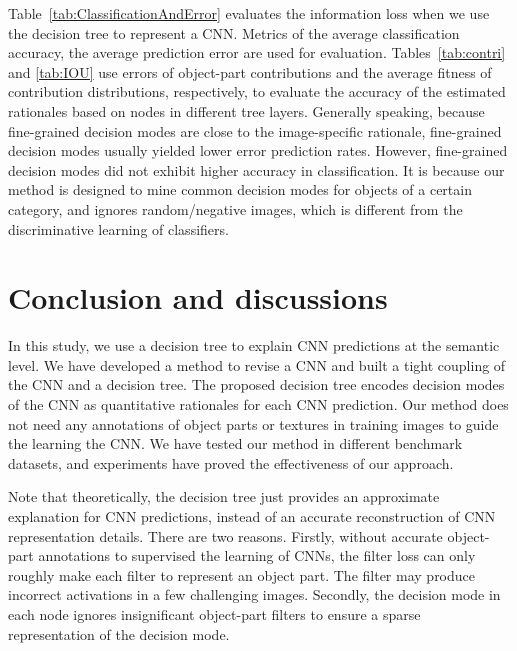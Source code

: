 \documentclass[10pt,twocolumn,letterpaper]{article}
\begin{document}
Table~\ref{tab:ClassificationAndError} evaluates the information loss when we use the decision tree to represent a CNN. Metrics of the average classification accuracy, the average prediction error are used for evaluation. Tables~\ref{tab:contri} and \ref{tab:IOU} use errors of object-part contributions and the average fitness of contribution distributions, respectively, to evaluate the accuracy of the estimated rationales based on nodes in different tree layers. Generally speaking, because fine-grained decision modes are close to the image-specific rationale, fine-grained decision modes usually yielded lower error prediction rates. However, fine-grained decision modes did not exhibit higher accuracy in classification. It is because our method is designed to mine common decision modes for objects of a certain category, and ignores random/negative images, which is different from the discriminative learning of classifiers.


\section{Conclusion and discussions}

In this study, we use a decision tree to explain CNN predictions at the semantic level. We have developed a method to revise a CNN and built a tight coupling of the CNN and a decision tree. The proposed decision tree encodes decision modes of the CNN as quantitative rationales for each CNN prediction. Our method does not need any annotations of object parts or textures in training images to guide the learning the CNN. We have tested our method in different benchmark datasets, and experiments have proved the effectiveness of our approach.

Note that theoretically, the decision tree just provides an approximate explanation for CNN predictions, instead of an accurate reconstruction of CNN representation details. There are two reasons. Firstly, without accurate object-part annotations to supervised the learning of CNNs, the filter loss can only roughly make each filter to represent an object part. The filter may produce incorrect activations in a few challenging images. Secondly, the decision mode in each node ignores insignificant object-part filters to ensure a sparse representation of the decision mode.

{\small


}
\end{document}
